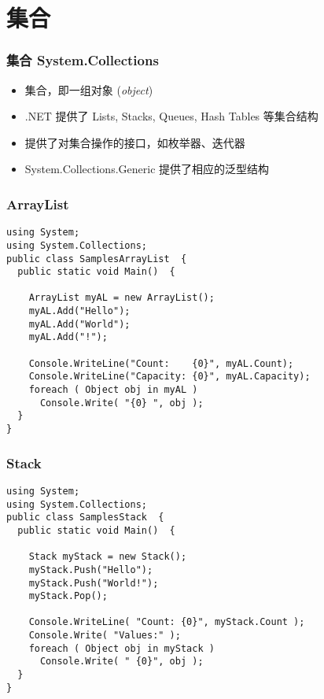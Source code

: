 
\section{集合}

\begin{frame}
\frametitle{集合 System.Collections}

\begin{itemize}
\setlength{\itemsep}{8pt plus 1pt}
\item 集合，即一组对象 (\textit{object})
\item .NET 提供了 Lists, Stacks, Queues, Hash Tables 等集合结构
\item 提供了对集合操作的接口，如枚举器、迭代器
\item System.Collections.Generic 提供了相应的泛型结构
\end{itemize}

\end{frame}

\begin{frame}[fragile]
\frametitle{ArrayList}
\begin{lstlisting}
using System;
using System.Collections;
public class SamplesArrayList  {
  public static void Main()  {

    ArrayList myAL = new ArrayList();
    myAL.Add("Hello");
    myAL.Add("World");
    myAL.Add("!");

    Console.WriteLine("Count:    {0}", myAL.Count);
    Console.WriteLine("Capacity: {0}", myAL.Capacity);
    foreach ( Object obj in myAL )
      Console.Write( "{0} ", obj );
  }
}
\end{lstlisting}
\end{frame}

\begin{frame}[fragile]
\frametitle{Stack}
\begin{lstlisting}
using System;
using System.Collections;
public class SamplesStack  {
  public static void Main()  {

    Stack myStack = new Stack();
    myStack.Push("Hello");
    myStack.Push("World!");
    myStack.Pop();

    Console.WriteLine( "Count: {0}", myStack.Count );
    Console.Write( "Values:" );
    foreach ( Object obj in myStack )
      Console.Write( " {0}", obj );
  }
}
\end{lstlisting}
\end{frame}

